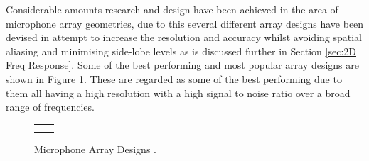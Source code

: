 \documentclass{UoNMCHA}
\numberwithin{equation}{section}
\begin{document}
    Considerable amounts research and design have been achieved in the area of microphone array geometries, due to this several different array designs have been devised in attempt to increase the resolution and accuracy whilst avoiding spatial aliasing and minimising side-lobe levels as is discussed further in Section \ref{sec:2D Freq Response}. Some of the best performing and most popular array designs are shown in Figure \ref{fig:Mic Arrays}. These are regarded as some of the best performing due to them all having a high resolution with a high signal to noise ratio over a broad range of frequencies.
    
        \begin{figure} [H]
            \centering
            \begin{tabular}{cc}
                 &
                 \\
                 &
            \end{tabular}
            \caption{Microphone Array Designs \citep{Pri13}.}
            \label{fig:Mic Arrays}
        \end{figure}
        
\end{document}
